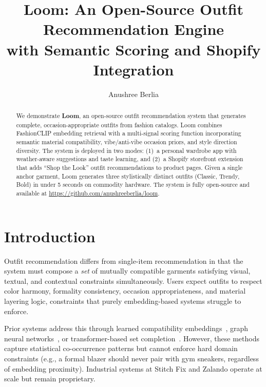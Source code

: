 \documentclass[sigconf]{acmart}
\title{Loom: An Open-Source Outfit Recommendation Engine\\with Semantic Scoring and Shopify Integration}
\author{Anushree Berlia}
\affiliation{%
  \institution{Independent Researcher}
}
\begin{document}
\begin{abstract}
We demonstrate \textbf{Loom}, an open-source outfit recommendation system
that generates complete, occasion-appropriate outfits from fashion catalogs.
Loom combines FashionCLIP embedding retrieval with a multi-signal scoring
function incorporating semantic material compatibility, vibe/anti-vibe
occasion priors, and style direction diversity.  The system is deployed in
two modes: (1)~a personal wardrobe app with weather-aware suggestions and
taste learning, and (2)~a Shopify storefront extension that adds ``Shop the
Look'' outfit recommendations to product pages.  Given a single anchor
garment, Loom generates three stylistically distinct outfits (Classic,
Trendy, Bold) in under 5 seconds on commodity hardware.  The system is
fully open-source and available at
\url{https://github.com/anushreeberlia/loom}.
\end{abstract}


\maketitle

\section{Introduction}

Outfit recommendation differs from single-item recommendation in that
the system must compose a \emph{set} of mutually compatible garments
satisfying visual, textual, and contextual constraints simultaneously.
Users expect outfits to respect color harmony, formality consistency,
occasion appropriateness, and material layering logic, constraints that
purely embedding-based systems struggle to enforce.

Prior systems address this through learned compatibility
embeddings~\cite{vasileva2018learning}, graph neural
networks~\cite{cui2019dressing}, or transformer-based set
completion~\cite{sarkar2023outfittransformer}.  However, these methods
capture statistical co-occurrence patterns but cannot enforce hard domain
constraints (e.g., a formal blazer should never pair with gym sneakers,
regardless of embedding proximity).  Industrial systems at Stitch Fix and
Zalando operate at scale but remain proprietary.
\end{document}
